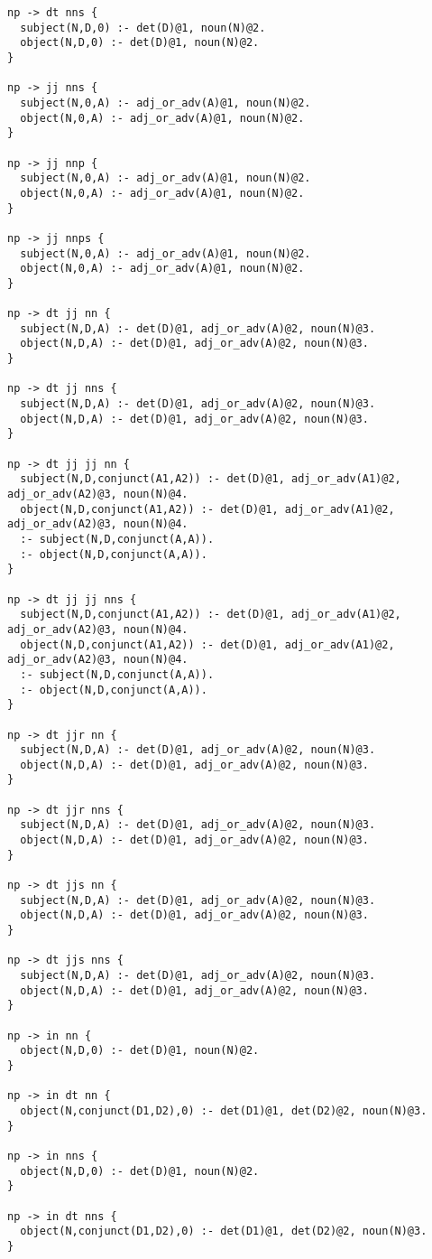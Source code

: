 \begin{lstlisting}
np -> dt nns {
  subject(N,D,0) :- det(D)@1, noun(N)@2.
  object(N,D,0) :- det(D)@1, noun(N)@2.
}

np -> jj nns {
  subject(N,0,A) :- adj_or_adv(A)@1, noun(N)@2.
  object(N,0,A) :- adj_or_adv(A)@1, noun(N)@2.
}

np -> jj nnp {
  subject(N,0,A) :- adj_or_adv(A)@1, noun(N)@2.
  object(N,0,A) :- adj_or_adv(A)@1, noun(N)@2.
}

np -> jj nnps {
  subject(N,0,A) :- adj_or_adv(A)@1, noun(N)@2.
  object(N,0,A) :- adj_or_adv(A)@1, noun(N)@2.
}

np -> dt jj nn {
  subject(N,D,A) :- det(D)@1, adj_or_adv(A)@2, noun(N)@3.
  object(N,D,A) :- det(D)@1, adj_or_adv(A)@2, noun(N)@3.
}

np -> dt jj nns {
  subject(N,D,A) :- det(D)@1, adj_or_adv(A)@2, noun(N)@3.
  object(N,D,A) :- det(D)@1, adj_or_adv(A)@2, noun(N)@3.
}

np -> dt jj jj nn {
  subject(N,D,conjunct(A1,A2)) :- det(D)@1, adj_or_adv(A1)@2, adj_or_adv(A2)@3, noun(N)@4.
  object(N,D,conjunct(A1,A2)) :- det(D)@1, adj_or_adv(A1)@2, adj_or_adv(A2)@3, noun(N)@4.
  :- subject(N,D,conjunct(A,A)).
  :- object(N,D,conjunct(A,A)).
}

np -> dt jj jj nns {
  subject(N,D,conjunct(A1,A2)) :- det(D)@1, adj_or_adv(A1)@2, adj_or_adv(A2)@3, noun(N)@4.
  object(N,D,conjunct(A1,A2)) :- det(D)@1, adj_or_adv(A1)@2, adj_or_adv(A2)@3, noun(N)@4.
  :- subject(N,D,conjunct(A,A)).
  :- object(N,D,conjunct(A,A)).
}

np -> dt jjr nn {
  subject(N,D,A) :- det(D)@1, adj_or_adv(A)@2, noun(N)@3.
  object(N,D,A) :- det(D)@1, adj_or_adv(A)@2, noun(N)@3.
}

np -> dt jjr nns {
  subject(N,D,A) :- det(D)@1, adj_or_adv(A)@2, noun(N)@3.
  object(N,D,A) :- det(D)@1, adj_or_adv(A)@2, noun(N)@3.
}

np -> dt jjs nn {
  subject(N,D,A) :- det(D)@1, adj_or_adv(A)@2, noun(N)@3.
  object(N,D,A) :- det(D)@1, adj_or_adv(A)@2, noun(N)@3.
}

np -> dt jjs nns {
  subject(N,D,A) :- det(D)@1, adj_or_adv(A)@2, noun(N)@3.
  object(N,D,A) :- det(D)@1, adj_or_adv(A)@2, noun(N)@3.
}

np -> in nn {
  object(N,D,0) :- det(D)@1, noun(N)@2.
}

np -> in dt nn {
  object(N,conjunct(D1,D2),0) :- det(D1)@1, det(D2)@2, noun(N)@3.
}

np -> in nns {
  object(N,D,0) :- det(D)@1, noun(N)@2.
}

np -> in dt nns {
  object(N,conjunct(D1,D2),0) :- det(D1)@1, det(D2)@2, noun(N)@3.
}


\end{lstlisting}
